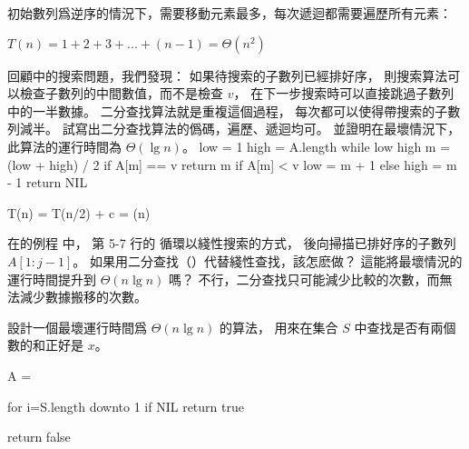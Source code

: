 初始數列爲逆序的情況下，需要移動元素最多，每次遞迴都需要遍歷所有元素：

$T(n) = 1 + 2 + 3 + ... + (n-1) = \Theta(n^2)$
\stopANSWER

回顧 中的搜索問題，我們發現：
如果待搜索的子數列已經排好序，
則搜索算法可以檢查子數列的中間數值，而不是檢查 $v$，
在下一步搜索時可以直接跳過子數列中的一半數據。
二分查找算法就是重複這個過程，
每次都可以使得帶搜索的子數列減半。
試寫出二分查找算法的僞碼，遍歷、遞迴均可。
並證明在最壞情況下，此算法的運行時間為 $\Theta(\lg n)$。
\stopEXERCISE
\startANSWER
{}
\startCLRSCODE
low = 1
high = A.length
while low \le high
	m = (low + high) / 2
	if A[m] == v
		return m
	if A[m] < v
		low = m + 1
	else
		high = m - 1
return NIL
\stopCLRSCODE

\startformula
T(n) = T(n/2) + c = \Theta(\lg n)
\stopformula
\stopANSWER

\startEXERCISE
在 的例程  中，
第 5-7 行的  循環以綫性搜索的方式，
後向掃描已排好序的子數列 $A[1:j-1]$。
如果用二分查找（）代替綫性查找，該怎麽做？
這能將最壞情況的運行時間提升到 $\Theta(n\lg n)$ 嗎？
\stopEXERCISE
\startANSWER
不行，二分查找只可能減少比較的次數，而無法減少數據搬移的次數。
\stopANSWER

\startEXERCISE
設計一個最壞運行時間爲 $\Theta(n\lg n)$ 的算法，
用來在集合 $S$ 中查找是否有兩個數的和正好是 $x$。
\stopEXERCISE

\startANSWER
{}
\startCLRSCODE
A = 

for i=S.length downto 1
	if  \ne NIL
		return true

return false
\stopCLRSCODE
\stopANSWER

\stopsection
